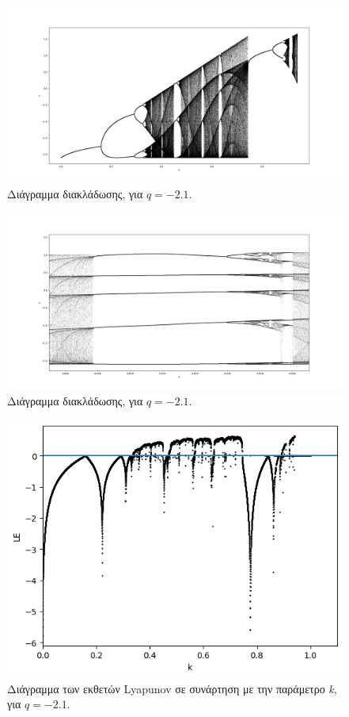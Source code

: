 \begin{figure}[ht]
	\centering
	\includegraphics[width=1\linewidth]{LateX images/graphs q21/g1}
	\caption{ Διάγραμμα διακλάδωσης, για $q=-2.1$.}
	\label{f:g41}
\end{figure}

\begin{figure}[ht]
	\centering
	\includegraphics[width=1\linewidth]{LateX images/graphs q21/g3}
	\caption{ Διάγραμμα διακλάδωσης, για $q=-2.1$.}
	\label{f:g43}
\end{figure}


\begin{figure}[ht]
	\centering
	\includegraphics[width=1\linewidth]{LateX images/graphs q21/g2}
	\caption{Διάγραμμα των εκθετών Lyapunov σε συνάρτηση με την παράμετρο \emph{k}, για $q=-2.1$.}
	\label{f:g42}
\end{figure}

